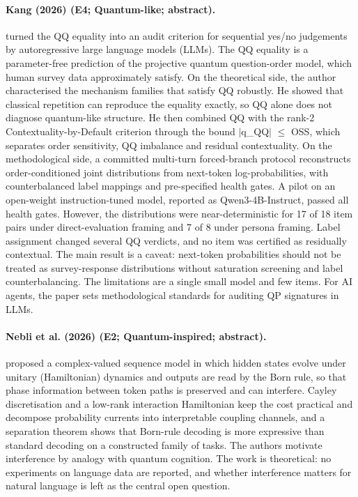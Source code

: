 \documentclass[10pt,a4paper]{article}
\begin{document}
\paragraph{Kang (2026) (E4; Quantum-like; abstract).} \citet{Kang2026} turned the QQ equality into an audit criterion for sequential yes/no judgements by autoregressive large language models (LLMs). The QQ equality is a parameter-free prediction of the projective quantum question-order model, which human survey data approximately satisfy. On the theoretical side, the author characterised the mechanism families that satisfy QQ robustly. He showed that classical repetition can reproduce the equality exactly, so QQ alone does not diagnose quantum-like structure. He then combined QQ with the rank-2 Contextuality-by-Default criterion through the bound $|$q\_QQ$|$ $\leq$ OSS, which separates order sensitivity, QQ imbalance and residual contextuality. On the methodological side, a committed multi-turn forced-branch protocol reconstructs order-conditioned joint distributions from next-token log-probabilities, with counterbalanced label mappings and pre-specified health gates. A pilot on an open-weight instruction-tuned model, reported as Qwen3-4B-Instruct, passed all health gates. However, the distributions were near-deterministic for 17 of 18 item pairs under direct-evaluation framing and 7 of 8 under persona framing. Label assignment changed several QQ verdicts, and no item was certified as residually contextual. The main result is a caveat: next-token probabilities should not be treated as survey-response distributions without saturation screening and label counterbalancing. The limitations are a single small model and few items. For AI agents, the paper sets methodological standards for auditing QP signatures in LLMs.

\paragraph{Nebli et al. (2026) (E2; Quantum-inspired; abstract).} \citet{Nebli2026} proposed a complex-valued sequence model in which hidden states evolve under unitary (Hamiltonian) dynamics and outputs are read by the Born rule, so that phase information between token paths is preserved and can interfere. Cayley discretisation and a low-rank interaction Hamiltonian keep the cost practical and decompose probability currents into interpretable coupling channels, and a separation theorem shows that Born-rule decoding is more expressive than standard decoding on a constructed family of tasks. The authors motivate interference by analogy with quantum cognition. The work is theoretical: no experiments on language data are reported, and whether interference matters for natural language is left as the central open question.
\end{document}
